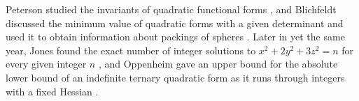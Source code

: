 \documentclass{amsart}
\theoremstyle{definition}
\begin{document}
Peterson studied the invariants of quadratic functional forms \cite{peterson1929class}, and Blichfeldt discussed the minimum value of quadratic forms with a given determinant and used it to obtain information about packings of spheres \cite{blichfeldt1929minimum}. Later in yet the same year, Jones found the exact number of integer solutions to $x^2 + 2y^2 + 3z^2 = n$ for every given integer $n$ \cite{jones1929number}, and Oppenheim gave an upper bound for the absolute lower bound of an indefinite ternary quadratic form as it runs through integers with a fixed Hessian \cite{oppenheim1929minima}. 

\end{document}

